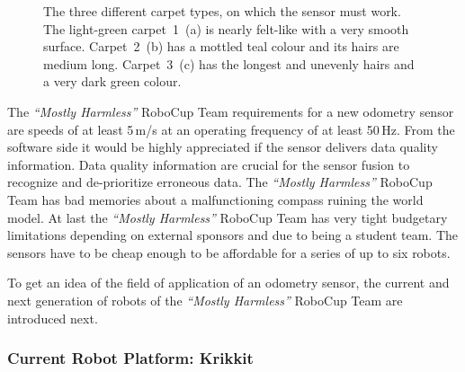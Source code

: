 \documentclass[12pt,a4paper]{article}
\newcommand{\MH}{\emph{``Mostly Harmless''} RoboCup Team\xspace}
\begin{document}
\begin{figure}[htbp]
  \begin{center}
      \hfill
      \hfill
    \caption{
      The three different carpet types, on which the sensor must work.
      The light-green carpet~1~(a) is nearly felt-like with a very smooth surface.
      Carpet~2~(b) has a mottled teal colour and its hairs are medium long.
      Carpet~3~(c) has the longest and unevenly hairs and a very dark green colour.
    }
    \label{fig:carpets}
  \end{center}
\end{figure}



The \MH requirements for a new odometry sensor are speeds of at least 5\,m/s at an operating frequency of at least 50\,Hz.
From the software side it would be highly appreciated if the sensor delivers data quality information.
Data quality information are crucial for the sensor fusion to recognize and de-prioritize erroneous data.
The \MH has bad memories about a malfunctioning compass ruining the world model.
At last the \MH has very tight budgetary limitations depending on external sponsors and due to being a student team.
The sensors have to be cheap enough to be affordable for a series of up to six robots.

To get an idea of the field of application of an odometry sensor, the current and next generation of robots of the \MH are introduced next.



\subsubsection{Current Robot Platform: Krikkit}
\label{sec:krikkit}
\end{document}
